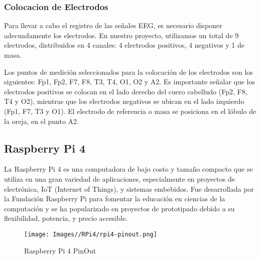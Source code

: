 \documentclass{article}
\begin{document}
\subsubsection{Colocacion de Electrodos}
Para llevar a cabo el registro de las señales EEG, es necesario disponer adecuadamente los electrodos. En nuestro proyecto, utilizamos un total de 9 electrodos, distribuidos en 4 canales: 4 electrodos positivos, 4 negativos y 1 de masa.

Los puntos de medición seleccionados para la colocación de los electrodos son los siguientes: Fp1, Fp2, F7, F8, T3, T4, O1, O2 y A2. Es importante señalar que los electrodos positivos se colocan en el lado derecho del cuero cabelludo (Fp2, F8, T4 y O2), mientras que los electrodos negativos se ubican en el lado izquierdo (Fp1, F7, T3 y O1). El electrodo de referencia o masa se posiciona en el lóbulo de la oreja, en el punto A2.

\subsection{Raspberry Pi 4}
La Raspberry Pi 4 es una computadora de bajo costo y tamaño compacto que se utiliza en una gran variedad de aplicaciones, especialmente en proyectos de electrónica, IoT (Internet of Things), y sistemas embebidos. Fue desarrollada por la Fundación Raspberry Pi para fomentar la educación en ciencias de la computación y se ha popularizado en proyectos de prototipado debido a su flexibilidad, potencia, y precio accesible.

\begin{figure}[H]
    \centering
    \texttt{[image: Images//RPi4/rpi4-pinout.png]}
    \caption{Raspberry Pi 4 PinOut}
    \label{fig:enter-label}
\end{figure}
\end{document}
